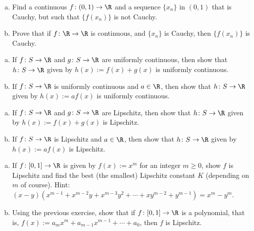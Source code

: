 \documentclass[12pt]{book}
\begin{document}
\begin{exercise}
\begin{enumerate}[a)]
 \item Find a continuous $f \colon (0,1) \to \R$ and a sequence $\{ x_n \}$ in
$(0,1)$ that is Cauchy, but such that $\{ f(x_n) \}$ is not Cauchy.
 \item Prove that if $f \colon \R \to \R$ is continuous, and $\{ x_n \}$ is
Cauchy, then $\{ f(x_n) \}$ is Cauchy.
\end{enumerate}
\end{exercise}

\begin{exercise}
\begin{enumerate}[a)]
 \item If $f \colon S \to \R$ and $g \colon S \to \R$ are uniformly continuous,
then show that $h \colon S \to \R$ given by $h(x) := f(x) + g(x)$
is uniformly continuous.
  \item If $f \colon S \to \R$ is uniformly continuous and $a \in \R$,
then show that $h \colon S \to \R$ given by $h(x) := a f(x)$
is uniformly continuous.
\end{enumerate}
\end{exercise}

\begin{exercise}
\begin{enumerate}[a)]
 \item If $f \colon S \to \R$ and $g \colon S \to \R$ are Lipschitz,
then show that $h \colon S \to \R$ given by $h(x) := f(x) + g(x)$
is Lipschitz.
  \item If $f \colon S \to \R$ is Lipschitz and $a \in \R$,
then show that $h \colon S \to \R$ given by $h(x) := a f(x)$
is Lipschitz.
\end{enumerate}
\end{exercise}

\begin{exercise}
\begin{enumerate}[a)]
 \item If $f \colon [0,1] \to \R$ is given by $f(x) := x^m$ for an integer
$m \geq 0$,
show $f$ is Lipschitz and find the best (the smallest) Lipschitz constant
$K$ (depending on $m$ of course).
Hint: $(x-y)(x^{m-1} + x^{m-2}y + x^{m-3}y^2 + \cdots + x y^{m-2} + y^{m-1}) = x^m - y^m$.
 \item Using the previous exercise, show that if $f \colon [0,1] \to \R$
is a polynomial, that is, $f(x) := a_m x^m + a_{m-1} x^{m-1} + \cdots + a_0$,
then $f$ is Lipschitz.
\end{enumerate}
\end{exercise}
\end{document}
